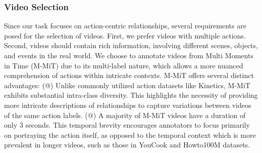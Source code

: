 \documentclass[letterpaper]{article}
\makeatletter
\newcommand{\Rmnum}[1]{\expandafter\@slowromancap\romannumeral #1@}
\makeatother
\begin{document}
\subsubsection{Video Selection}
Since our task focuses on action-centric relationships, several requirements are posed for the selection of videos.
First, we prefer videos with multiple actions. Second, videos should contain rich information, involving different scenes, objects, and events in the real world.
We choose to annotate videos from Multi Moments in Time (M-MiT) \cite{9609554} due to its multi-label nature, which allows a more nuanced comprehension of actions within intricate contexts.
M-MiT offers several distinct advantages:
(\Rmnum{1}) Unlike commonly utilized action datasets like Kinetics, M-MiT exhibits substantial intra-class diversity. This highlights the necessity of providing more intricate descriptions of relationships to capture variations between videos of the same action labels.
(\Rmnum{2}) A majority of M-MiT videos have a duration of only 3 seconds. This temporal brevity encourages annotators to focus primarily on portraying the action itself, as opposed to the temporal context which is more prevalent in longer videos, such as those in YouCook and Howto100M datasets.
\end{document}
